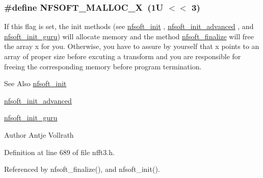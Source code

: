 \hypertarget{group__nfsoft_gabe0d04599c1b06144e9a66fc2ac7b09d}{
\subsubsection[{N\-F\-S\-O\-F\-T\-\_\-\-M\-A\-L\-L\-O\-C\-\_\-\-X}]{\setlength{\rightskip}{0pt plus 5cm}\#define N\-F\-S\-O\-F\-T\-\_\-\-M\-A\-L\-L\-O\-C\-\_\-\-X~(1\-U $<$$<$ 3)}}\label{group__nfsoft_gabe0d04599c1b06144e9a66fc2ac7b09d}
If this flag is set, the init methods (see \hyperlink{group__nfsoft_ga31c884458165fa204073c6c16c10775e}{nfsoft\-\_\-init} , \hyperlink{group__nfsoft_gaf4aec4ee2a2a5d56ca27c4f1a7f90b18}{nfsoft\-\_\-init\-\_\-advanced} , and \hyperlink{group__nfsoft_ga1c13cdd3f82f48fa41acdd313cdc2052}{nfsoft\-\_\-init\-\_\-guru}) will allocate memory and the method \hyperlink{group__nfsoft_ga30b5c6ae1ff496680f11ddcaad2d5a47}{nfsoft\-\_\-finalize} will free the array {\ttfamily x} for you. Otherwise, you have to assure by yourself that {\ttfamily x} points to an array of proper size before excuting a transform and you are responsible for freeing the corresponding memory before program termination.

\begin{DoxySeeAlso}{See Also}
\hyperlink{group__nfsoft_ga31c884458165fa204073c6c16c10775e}{nfsoft\-\_\-init} 

\hyperlink{group__nfsoft_gaf4aec4ee2a2a5d56ca27c4f1a7f90b18}{nfsoft\-\_\-init\-\_\-advanced} 

\hyperlink{group__nfsoft_ga1c13cdd3f82f48fa41acdd313cdc2052}{nfsoft\-\_\-init\-\_\-guru} 
\end{DoxySeeAlso}
\begin{DoxyAuthor}{Author}
Antje Vollrath 
\end{DoxyAuthor}


Definition at line 689 of file nfft3.\-h.



Referenced by nfsoft\-\_\-finalize(), and nfsoft\-\_\-init().

